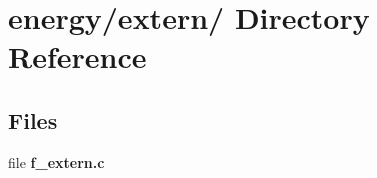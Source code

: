 \section{energy/extern/ Directory Reference}
\label{dir_92add268a5df37f7edb950e7a8efa14f}
\subsection*{Files}
\begin{CompactItemize}
\item 
file {\bf f\_\-extern.c}
\end{CompactItemize}

